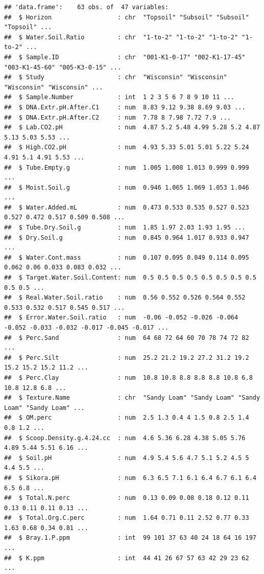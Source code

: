 \documentclass[]{article}
\begin{document}
\begin{verbatim}
## 'data.frame':    63 obs. of  47 variables:
##  $ Horizon                  : chr  "Topsoil" "Subsoil" "Subsoil" "Topsoil" ...
##  $ Water.Soil.Ratio         : chr  "1-to-2" "1-to-2" "1-to-2" "1-to-2" ...
##  $ Sample.ID                : chr  "001-K1-0-17" "002-K1-17-45" "003-K1-45-60" "005-K3-0-15" ...
##  $ Study                    : chr  "Wisconsin" "Wisconsin" "Wisconsin" "Wisconsin" ...
##  $ Sample.Number            : int  1 2 3 5 6 7 8 9 10 11 ...
##  $ DNA.Extr.pH.After.C1     : num  8.83 9.12 9.38 8.69 9.03 ...
##  $ DNA.Extr.pH.After.C2     : num  7.78 8 7.98 7.72 7.9 ...
##  $ Lab.CO2.pH               : num  4.87 5.2 5.48 4.99 5.28 5.2 4.87 5.13 5.03 5.53 ...
##  $ High.CO2.pH              : num  4.93 5.33 5.01 5.01 5.22 5.24 4.91 5.1 4.91 5.53 ...
##  $ Tube.Empty.g             : num  1.005 1.008 1.013 0.999 0.999 ...
##  $ Moist.Soil.g             : num  0.946 1.065 1.069 1.053 1.046 ...
##  $ Water.Added.mL           : num  0.473 0.533 0.535 0.527 0.523 0.527 0.472 0.517 0.509 0.508 ...
##  $ Tube.Dry.Soil.g          : num  1.85 1.97 2.03 1.93 1.95 ...
##  $ Dry.Soil.g               : num  0.845 0.964 1.017 0.933 0.947 ...
##  $ Water.Cont.mass          : num  0.107 0.095 0.049 0.114 0.095 0.062 0.06 0.033 0.083 0.032 ...
##  $ Target.Water.Soil.Content: num  0.5 0.5 0.5 0.5 0.5 0.5 0.5 0.5 0.5 0.5 ...
##  $ Real.Water.Soil.ratio    : num  0.56 0.552 0.526 0.564 0.552 0.533 0.532 0.517 0.545 0.517 ...
##  $ Error.Water.Soil.ratio   : num  -0.06 -0.052 -0.026 -0.064 -0.052 -0.033 -0.032 -0.017 -0.045 -0.017 ...
##  $ Perc.Sand                : num  64 68 72 64 60 70 78 74 72 82 ...
##  $ Perc.Silt                : num  25.2 21.2 19.2 27.2 31.2 19.2 15.2 15.2 15.2 11.2 ...
##  $ Perc.Clay                : num  10.8 10.8 8.8 8.8 8.8 10.8 6.8 10.8 12.8 6.8 ...
##  $ Texture.Name             : chr  "Sandy Loam" "Sandy Loam" "Sandy Loam" "Sandy Loam" ...
##  $ OM.perc                  : num  2.5 1.3 0.4 4 1.5 0.8 2.5 1.4 0.8 1.2 ...
##  $ Scoop.Density.g.4.24.cc  : num  4.6 5.36 6.28 4.38 5.05 5.76 4.89 5.44 5.51 6.16 ...
##  $ Soil.pH                  : num  4.9 5.4 5.6 4.7 5.1 5.2 4.5 5 4.4 5.5 ...
##  $ Sikora.pH                : num  6.3 6.5 7.1 6.1 6.4 6.7 6.1 6.4 6.5 6.8 ...
##  $ Total.N.perc             : num  0.13 0.09 0.08 0.18 0.12 0.11 0.13 0.11 0.11 0.13 ...
##  $ Total.Org.C.perc         : num  1.64 0.71 0.11 2.52 0.77 0.33 1.63 0.68 0.34 0.81 ...
##  $ Bray.1.P.ppm             : int  99 101 37 63 40 24 18 64 16 197 ...
##  $ K.ppm                    : int  44 41 26 67 57 63 42 29 23 62 ...

\end{verbatim}
\end{document}
